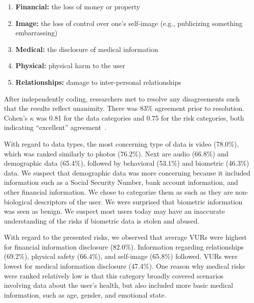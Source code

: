 \documentclass[conference]{IEEEtran}
\begin{document}
\begin{enumerate}%
\item {\bf Financial:} the loss of money or property
\item {\bf Image:} the loss of control over one's self-image (e.g., publicizing something embarrassing)
\item {\bf Medical:} the disclosure of medical information
\item {\bf Physical:} physical harm to the user
\item {\bf Relationships:} damage to inter-personal relationships
\end{enumerate}

After independently coding,  researchers met to resolve any disagreements such that the results reflect unanimity. There was  83\% agreement prior to resolution. Cohen's $\kappa$ was 0.81 for the data categories and 0.75 for the  risk categories, both indicating ``excellent'' agreement~\cite{Fleiss2003}. 

With regard to data types, the most concerning type of data is video (78.0\%), which was ranked similarly to photos (76.2\%). Next are audio (66.8\%) and demographic data (65.4\%), followed by behavioral (53.1\%) and biometric (46.3\%) data. We suspect that demographic data was more concerning because it included information such as a Social Security Number, bank account information, and other financial information. We chose to categorize them as such as they are non-biological descriptors of the user. We were surprised that biometric information was seen as  benign. We suspect most users today may have an inaccurate understanding of the risks if biometric data is stolen and abused.

With regard to the presented risks, we observed that average VURs were highest for financial information disclosure (82.0\%). Information regarding relationships (69.2\%), physical safety (66.4\%), and self-image (65.8\%) followed. VURs were lowest for medical information disclosure (47.4\%). One reason why medical risks were ranked relatively low is that this category broadly covered scenarios involving data about the user's health, but also included more basic medical information, such as age, gender, and emotional state. 
\end{document}
